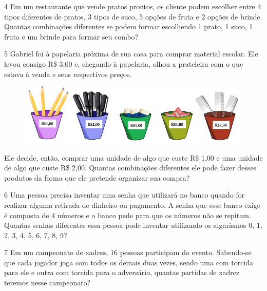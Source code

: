 \num{4} Em um restaurante que vende pratos prontos, os cliente podem escolher entre 4 tipos diferentes de pratos, 3 tipos de suco, 5 opções de fruta e 2 opções de brinde. Quantas combinações diferentes se podem formar escolhendo 1 prato, 1 suco, 1 fruta e um brinde para
formar seu combo?

\bigskip\bigskip\bigskip\bigskip

\num{5} Gabriel foi à papelaria próxima de sua casa para comprar material
escolar. Ele levou consigo R\$ 3,00 e, chegando à papelaria, olhou a
prateleira com o que estava à venda e seus respectivos preços.

\begin{figure}[htpb!]
\includegraphics[width=\textwidth]{../ilustracoes/MAT5/SAEB_5ANO_MAT_figura83.png}
\end{figure}

Ele decide, então, comprar uma unidade de algo que custe R\$ 1,00 e uma unidade de
algo que custe R\$ 2,00. Quantas combinações diferentes ele pode fazer
desses produtos da forma que ele pretende organizar sua compra?


\pagebreak
\num{6} Uma pessoa precisa inventar uma senha que utilizará no banco quando
for realizar alguma retirada de dinheiro ou pagamento. A senha que esse
banco exige é composta de 4 números e o banco pede para que os números
não se repitam. Quantas senhas diferentes essa pessoa pode inventar
utilizando os algarismos 0, 1, 2, 3, 4, 5, 6, 7, 8, 9?

\bigskip\bigskip

\num{7} Em um campeonato de xadrez, 16 pessoas participam do evento.
Sabendo-se que cada jogador joga com todos os demais duas vezes, sendo
uma com torcida para ele e outra com torcida para o adversário, quantas
partidas de xadrez teremos nesse campeonato?


